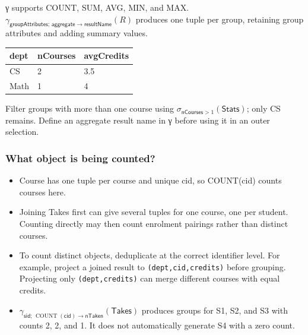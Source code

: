 γ supports COUNT, SUM, AVG, MIN, and MAX. \(\gamma _{\mathsf{groupAttributes};\,\mathsf{aggregate}\rightarrow \mathsf{resultName}}(R)\) produces one tuple per group, retaining group attributes and adding summary values.


\begin{longtable}[]{@{}lll@{}}
\toprule\noalign{}
dept & nCourses & avgCredits \\
\midrule\noalign{}
\endhead
\bottomrule\noalign{}
\endlastfoot
CS & 2 & 3.5 \\
Math & 1 & 4 \\
\end{longtable}

Filter groups with more than one course using \(\sigma _{\mathsf{nCourses}>1}(\mathsf{Stats})\); only CS remains. Define an aggregate result name in γ before using it in an outer selection.

\subsubsection{What object is being counted?}\label{05_relational_algebra_en-what-object-is-being-counted}

\begin{itemize}
\tightlist
\item
  Course has one tuple per course and unique cid, so COUNT(cid) counts courses here.
\item
  Joining Takes first can give several tuples for one course, one per student. Counting directly may then count enrolment pairings rather than distinct courses.
\item
  To count distinct objects, deduplicate at the correct identifier level. For example, project a joined result to \texttt{(\allowbreak{}dept,\allowbreak{}cid,\allowbreak{}credits)\allowbreak{}} before grouping. Projecting only \texttt{(\allowbreak{}dept,\allowbreak{}credits)\allowbreak{}} can merge different courses with equal credits.
\item
  \(\gamma _{\mathsf{sid};\,\operatorname{COUNT}(\mathsf{cid})\rightarrow \mathsf{nTaken}}(\mathsf{Takes})\) produces groups for S1, S2, and S3 with counts 2, 2, and 1. It does not automatically generate S4 with a zero count.
\end{itemize}

